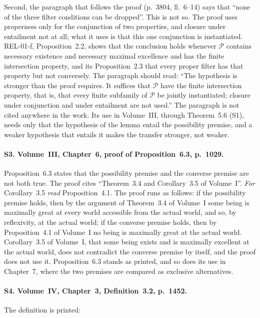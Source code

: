\documentclass{situationist-preprint}
\begin{document}
Second, the paragraph that follows the proof (p.~3804, ll.~6--14) says that \enquote{none of the three filter conditions can be dropped}. This is not so. The proof uses properness only for the conjunction of two properties, and closure under entailment not at all; what it uses is that this one conjunction is instantiated. REL-01-f, Proposition~2.2, shows that the conclusion holds whenever $\mathcal{P}$ contains necessary existence and necessary maximal excellence and has the finite intersection property, and its Proposition~2.3 that every proper filter has that property but not conversely. The paragraph should read: \enquote{The hypothesis is stronger than the proof requires. It suffices that $\mathcal{P}$ have the finite intersection property, that is, that every finite subfamily of $\mathcal{P}$ be jointly instantiated; closure under conjunction and under entailment are not used.} The paragraph is not cited anywhere in the work. Its use in Volume~III, through Theorem~5.6 (S1), needs only that the hypothesis of the lemma entail the possibility premise, and a weaker hypothesis that entails it makes the transfer stronger, not weaker.

\paragraph{S3. Volume~III, Chapter~6, proof of Proposition~6.3, p.~1029.} Proposition~6.3 states that the possibility premise and the converse premise are not both true. The proof cites \enquote{Theorem~3.4 and Corollary~3.5 of Volume~I}. \textit{For} Corollary~3.5 \textit{read} Proposition~4.1. The proof runs as follows: if the possibility premise holds, then by the argument of Theorem~3.4 of Volume~I some being is maximally great at every world accessible from the actual world, and so, by reflexivity, at the actual world; if the converse premise holds, then by Proposition~4.1 of Volume~I no being is maximally great at the actual world. Corollary~3.5 of Volume~I, that some being exists and is maximally excellent at the actual world, does not contradict the converse premise by itself, and the proof does not use it. Proposition~6.3 stands as printed, and so does its use in Chapter~7, where the two premises are compared as exclusive alternatives.

\paragraph{S4. Volume~IV, Chapter~3, Definition~3.2, p.~1452.} The definition is printed:
\end{document}
